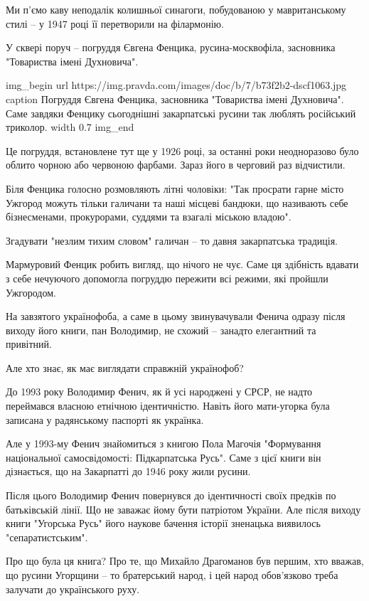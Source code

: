 Ми п’ємо каву неподалік колишньої синагоги, побудованою у мавританському стилі
– у 1947 році її перетворили на філармонію.

У сквері поруч – погруддя Євгена Фенцика, русина-москвофіла, засновника
"Товариства імені Духновича".

\ifcmt
img_begin 
        url https://img.pravda.com/images/doc/b/7/b73f2b2-dscf1063.jpg
        caption Погруддя Євгена Фенцика, засновника "Товариства імені Духновича". Саме завдяки Фенцику сьогоднішні закарпатські русини так люблять російський триколор.
        width 0.7
img_end
\fi

Це погруддя, встановлене тут ще у 1926 році, за останні роки неодноразово було
облито чорною або червоною фарбами. Зараз його в черговий раз відчистили.

Біля Фенцика голосно розмовляють літні чоловіки: "Так просрати гарне місто
Ужгород можуть тільки галичани та наші місцеві бандюки, що називають себе
бізнесменами, прокурорами, суддями та взагалі міською владою".

Згадувати "незлим тихим словом" галичан – то давня закарпатська традиція.

Мармуровий Фенцик робить вигляд, що нічого не чує. Саме ця здібність вдавати з
себе нечуючого допомогла погруддю пережити всі режими, які пройшли Ужгородом.

На завзятого українофоба, а саме в цьому звинувачували Фенича одразу після
виходу його книги, пан Володимир, не схожий – занадто елегантний та привітний.

Але хто знає, як має виглядати справжній українофоб?

До 1993 року Володимир Фенич, як й усі народжені у СРСР, не надто переймався
власною етнічною ідентичністю. Навіть його мати-угорка була записана у
радянському паспорті як українка. 

Але у 1993-му Фенич знайомиться з книгою Пола Магочія "Формування національної
самосвідомості: Підкарпатська Русь". Саме з цієї книги він дізнається, що на
Закарпатті до 1946 року жили русини.

Після цього Володимир Фенич повернувся до ідентичності своїх предків по
батьківській лінії. Що не заважає йому бути патріотом України. Але після виходу
книги "Угорська Русь" його наукове бачення історії зненацька виявилось
"сепаратистським".

Про що була ця книга? Про те, що Михайло Драгоманов був першим, хто вважав, що
русини Угорщини – то братерський народ, і цей народ обов’язково треба залучати
до українського руху.

